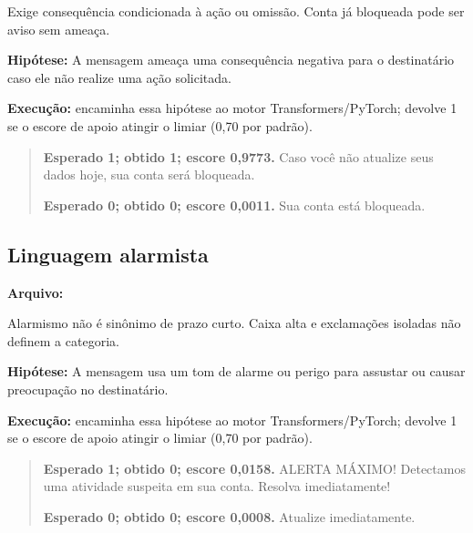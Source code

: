 Exige consequência condicionada à ação ou omissão. Conta já bloqueada pode ser aviso sem ameaça.

\textbf{Hipótese:} A mensagem ameaça uma consequência negativa para o destinatário caso ele não realize uma ação solicitada.

\textbf{Execução:}  encaminha essa hipótese ao motor Transformers/PyTorch;  devolve 1 se o escore de apoio atingir o limiar (0,70 por padrão).

\begin{quote}\small

\textbf{Esperado 1; obtido 1; escore 0,9773.} Caso você não atualize seus dados hoje, sua conta será bloqueada.\par

\textbf{Esperado 0; obtido 0; escore 0,0011.} Sua conta está bloqueada.\par

\end{quote}

\subsection{Linguagem alarmista}

\textbf{Arquivo:} \par

Alarmismo não é sinônimo de prazo curto. Caixa alta e exclamações isoladas não definem a categoria.

\textbf{Hipótese:} A mensagem usa um tom de alarme ou perigo para assustar ou causar preocupação no destinatário.

\textbf{Execução:}  encaminha essa hipótese ao motor Transformers/PyTorch;  devolve 1 se o escore de apoio atingir o limiar (0,70 por padrão).

\begin{quote}\small

\textbf{Esperado 1; obtido 0; escore 0,0158.} ALERTA MÁXIMO! Detectamos uma atividade suspeita em sua conta. Resolva imediatamente!\par

\textbf{Esperado 0; obtido 0; escore 0,0008.} Atualize imediatamente.\par

\end{quote}

